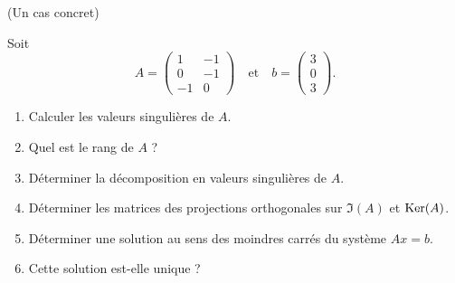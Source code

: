 \documentclass[a4paper,12pt,reqno]{amsart}
\begin{document}
\begin{exo} (Un cas concret)

    Soit
    $$
        A = \begin{pmatrix}
                1  & -1 \\
                0  & -1 \\
                -1 & 0
            \end{pmatrix}
        \quad\text{et}\quad
        b = \begin{pmatrix}
                3 \\
                0 \\
                3
            \end{pmatrix}.
    $$
    \begin{enumerate}
        \item Calculer les valeurs singulières de $A$.

        \item Quel est le rang de $A$ ?

        \item Déterminer la décomposition en valeurs singulières de $A$.

        \item Déterminer les matrices des projections orthogonales sur $\Im(A)$ et $\operatorname{Ker}(A)$.

        \item Déterminer une solution au sens des moindres carrés du système $Ax=b$.

        \item Cette solution est-elle unique ?
    \end{enumerate}
\end{exo}
\end{document}
